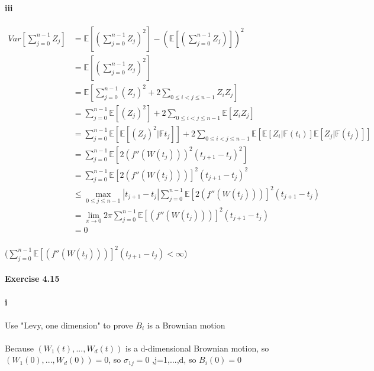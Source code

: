 \documentclass{article}
\begin{document}
\paragraph{iii}
\begin{align*}
  Var[\sum_{j=0}^{n-1}Z_j] &=\mathbb{E}[(\sum_{j=0}^{n-1}Z_j)^2]-(\mathbb{E}[(\sum_{j=0}^{n-1}Z_j)])^2\\
   &=\mathbb{E}[(\sum_{j=0}^{n-1}Z_j)^2]  \\
 &= \mathbb{E}[\sum_{j=0}^{n-1}(Z_j)^2+2\sum_{0\le i<j \le n-1}^{}Z_{i}Z_{j}] \\
 &=\sum_{j=0}^{n-1}\mathbb{E}[(Z_j)^2]+2\sum_{0\le i<j \le n-1}^{}\mathbb{E}[Z_{i}Z_{j}] \\
 &=\sum_{j=0}^{n-1}\mathbb{E}[\mathbb{E}[(Z_j)^2|\mathbb{F}{t_j}]]+2\sum_{0\le i<j \le n-1}^{}\mathbb{E}[\mathbb{E}[Z_{i}|\mathbb{F}(t_i)]\mathbb{E}[Z_{j}|\mathbb{F}(t_j)]] \\
    & =\sum_{j=0}^{n-1}\mathbb{E}[ 2(f''(W(t_j)))^2(t_{j+1}-t_j)^2]\\
    &=\sum_{j=0}^{n-1}\mathbb{E}[ 2(f''(W(t_j)))]^2(t_{j+1}-t_j)^2\\
    &\le \max_{0\le j \le n-1}|t_{j+1}-t_j|\sum_{j=0}^{n-1}\mathbb{E}[ 2(f''(W(t_j)))]^2(t_{j+1}-t_j)\\
    &=\lim_{\pi \to 0}2\pi\sum_{j=0}^{n-1}\mathbb{E}[ (f''(W(t_j)))]^2(t_{j+1}-t_j)\\
    &=0
\end{align*}
\paragraph{}{($\sum_{j=0}^{n-1}\mathbb{E}[ (f''(W(t_j)))]^2(t_{j+1}-t_j)< \infty$)}
\paragraph{Exercise 4.15}
\paragraph{i}
\paragraph{}{Use "Levy, one dimension" to prove $B_i$ is a Brownian motion}
\paragraph{}{Because $(W_1(t),...,W_d(t))$ is a d-dimensional Brownian motion, so $(W_1(0),...,W_d(0))=0$, so $\sigma_{1j}=0$ ,j=1,...,d, so $B_i(0)=0$}
\end{document}
